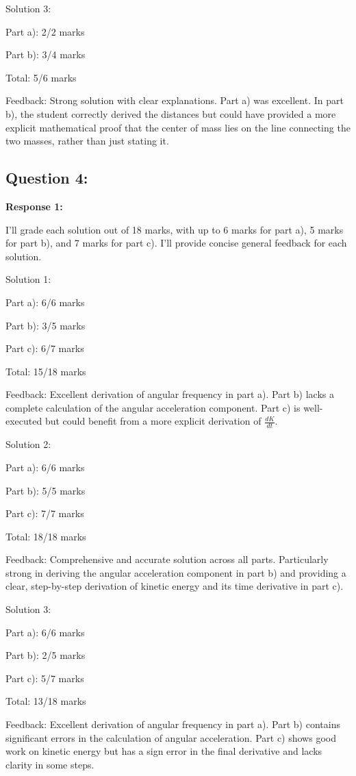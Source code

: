 \documentclass[a4paper,11pt]{article}
\begin{document}
Solution 3:

Part a): 2/2 marks

Part b): 3/4 marks

Total: 5/6 marks

Feedback: Strong solution with clear explanations. Part a) was excellent. In part b), the student correctly derived the distances but could have provided a more explicit mathematical proof that the center of mass lies on the line connecting the two masses, rather than just stating it.


\subsection*{Question 4:}

\textbf{Response 1:}

I'll grade each solution out of 18 marks, with up to 6 marks for part a), 5 marks for part b), and 7 marks for part c). I'll provide concise general feedback for each solution.

Solution 1:

Part a): 6/6 marks

Part b): 3/5 marks

Part c): 6/7 marks

Total: 15/18 marks

Feedback: Excellent derivation of angular frequency in part a). Part b) lacks a complete calculation of the angular acceleration component. Part c) is well-executed but could benefit from a more explicit derivation of \(\frac{dK}{dt}\).

Solution 2:

Part a): 6/6 marks

Part b): 5/5 marks

Part c): 7/7 marks

Total: 18/18 marks

Feedback: Comprehensive and accurate solution across all parts. Particularly strong in deriving the angular acceleration component in part b) and providing a clear, step-by-step derivation of kinetic energy and its time derivative in part c).

Solution 3:

Part a): 6/6 marks

Part b): 2/5 marks

Part c): 5/7 marks

Total: 13/18 marks

Feedback: Excellent derivation of angular frequency in part a). Part b) contains significant errors in the calculation of angular acceleration. Part c) shows good work on kinetic energy but has a sign error in the final derivative and lacks clarity in some steps.
\end{document}
